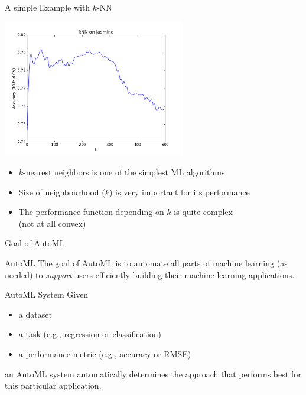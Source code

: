 \begin{frame}[c]{A simple Example with $k$-NN}

\centering
\includegraphics[width=0.6\textwidth]{images/kNN-jasmine}

\begin{itemize}
  \item $k$-nearest neighbors is one of the simplest ML algorithms
  \item Size of neighbourhood ($k$) is very important for its performance
  \item The performance function depending on $k$ is quite complex\\ (not at all convex)
\end{itemize}

\end{frame}
\begin{frame}[c]{Goal of AutoML}

\begin{block}{AutoML}
The goal of AutoML is to automate all parts of machine learning (as needed)
to \emph{support} users efficiently building their machine learning applications.
\end{block}

\bigskip
\pause

\begin{block}{AutoML System}
Given
\begin{itemize}
  \item a dataset
  \item a task (e.g., regression or classification)
  \item a performance metric (e.g., accuracy or RMSE)
\end{itemize}
an AutoML system automatically determines the approach 
that performs best for this particular application.
\end{block}

\end{frame}
